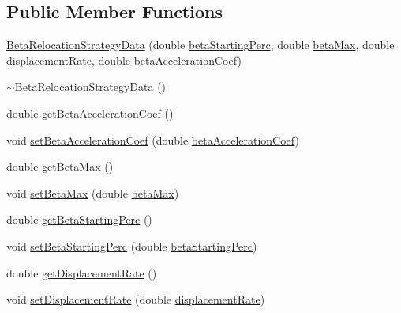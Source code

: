 \subsection*{Public Member Functions}
\begin{DoxyCompactItemize}
\item 
\hyperlink{structBetaRelocationStrategyData_aa8b0b5da68740b089a3e7623b912ce94}{Beta\+Relocation\+Strategy\+Data} (double \hyperlink{structBetaRelocationStrategyData_a979c9c710b41d2d745ef519b4eff2b9b}{beta\+Starting\+Perc}, double \hyperlink{structBetaRelocationStrategyData_acfd06a41587b792b0f85807fe800b46a}{beta\+Max}, double \hyperlink{structBetaRelocationStrategyData_a92704a1adaddfe1d7545fd3f1c921fcd}{displacement\+Rate}, double \hyperlink{structBetaRelocationStrategyData_a957ba3439a50f2dadf2e500ac0cfcd3c}{beta\+Acceleration\+Coef})
\item 
\hyperlink{structBetaRelocationStrategyData_aba59c29006f208b6aa9694f11cefbb3b}{$\sim$\+Beta\+Relocation\+Strategy\+Data} ()
\item 
double \hyperlink{structBetaRelocationStrategyData_aabba2baebc6e6b1eebc7ab84f3ceeb5b}{get\+Beta\+Acceleration\+Coef} ()
\item 
void \hyperlink{structBetaRelocationStrategyData_a217653e9479fd18e2d32e95ba8f2b5ba}{set\+Beta\+Acceleration\+Coef} (double \hyperlink{structBetaRelocationStrategyData_a957ba3439a50f2dadf2e500ac0cfcd3c}{beta\+Acceleration\+Coef})
\item 
double \hyperlink{structBetaRelocationStrategyData_a29fa5c11b663b88ed1771a603a0fc230}{get\+Beta\+Max} ()
\item 
void \hyperlink{structBetaRelocationStrategyData_ab46e2b4b27320698671e4c4b113cb2a8}{set\+Beta\+Max} (double \hyperlink{structBetaRelocationStrategyData_acfd06a41587b792b0f85807fe800b46a}{beta\+Max})
\item 
double \hyperlink{structBetaRelocationStrategyData_a28b664079989690fdc9f56927807b3a8}{get\+Beta\+Starting\+Perc} ()
\item 
void \hyperlink{structBetaRelocationStrategyData_aa49e61c2d389efdecd637a3325cc5a2e}{set\+Beta\+Starting\+Perc} (double \hyperlink{structBetaRelocationStrategyData_a979c9c710b41d2d745ef519b4eff2b9b}{beta\+Starting\+Perc})
\item 
double \hyperlink{structBetaRelocationStrategyData_a96c3430655d3b0c2d0a41fe6515fbf18}{get\+Displacement\+Rate} ()
\item 
void \hyperlink{structBetaRelocationStrategyData_a542d95263cbcd95c32b43f31881331a5}{set\+Displacement\+Rate} (double \hyperlink{structBetaRelocationStrategyData_a92704a1adaddfe1d7545fd3f1c921fcd}{displacement\+Rate})
\end{DoxyCompactItemize}
